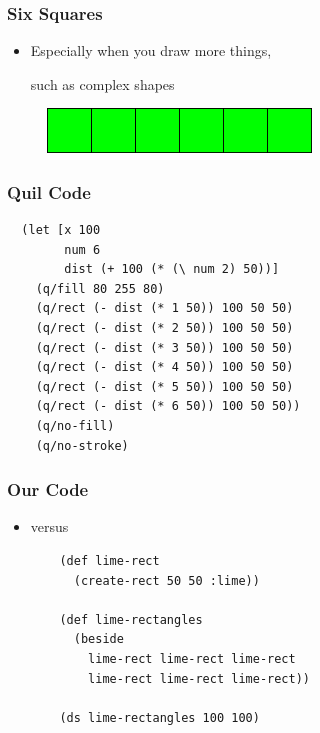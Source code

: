 \documentclass{beamer}
\begin{document}
\begin{frame}
	\frametitle{Six Squares}
	\begin{itemize}
		\item Especially when you draw more things,\par such as complex shapes
	\end{itemize}
		\begin{figure}[h]
			\includegraphics[width=7cm]{PresentationImages/lime-rectangles.png}
			\centering
		\end{figure}
\end{frame}

\begin{frame}[fragile]
\frametitle{Quil Code}
		\begin{verbatim}
  (let [x 100
  		num 6
  		dist (+ 100 (* (\ num 2) 50))]
	(q/fill 80 255 80)
	(q/rect (- dist (* 1 50)) 100 50 50)
	(q/rect (- dist (* 2 50)) 100 50 50)
	(q/rect (- dist (* 3 50)) 100 50 50)
	(q/rect (- dist (* 4 50)) 100 50 50)
	(q/rect (- dist (* 5 50)) 100 50 50)
	(q/rect (- dist (* 6 50)) 100 50 50))
	(q/no-fill)
	(q/no-stroke)
		\end{verbatim}	

\end{frame}

\begin{frame}[fragile]
\frametitle{Our Code}
	\begin{itemize}
		\item versus
		\begin{verbatim}
	(def lime-rect 
	  (create-rect 50 50 :lime))
	  
	(def lime-rectangles 
	  (beside 
	    lime-rect lime-rect lime-rect 
	    lime-rect lime-rect lime-rect))
	  						  
	(ds lime-rectangles 100 100)
			\end{verbatim}
	\end{itemize}
\end{frame}
\end{document}
